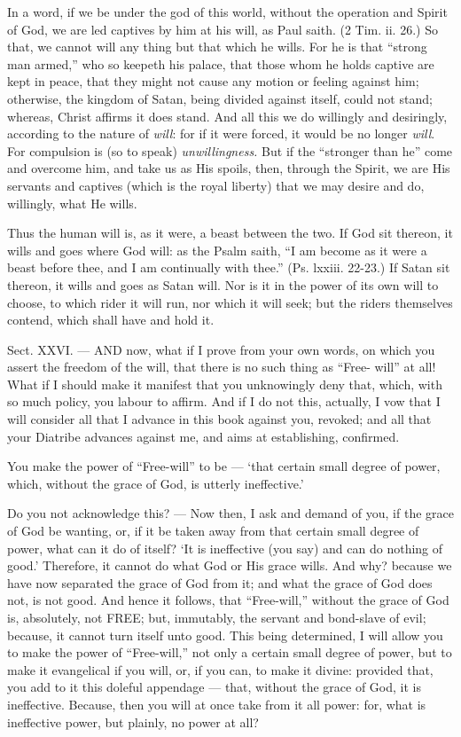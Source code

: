 In a word, if we be under the god of this world, without the operation and Spirit of God, we are led captives by him at his will, as Paul saith. (2 Tim. ii. 26.) So that, we cannot will any thing but that which he wills. For he is that “strong man armed,” who so keepeth his palace, that those whom he holds captive are kept in peace, that they might not cause any motion or feeling against him; otherwise, the kingdom of Satan, being divided against itself, could not stand; whereas, Christ affirms it does stand. And all this we do willingly and desiringly, according to the nature of \emph{will}: for if it were forced, it would be no longer \emph{will}. For compulsion is (so to speak) \emph{unwillingness. }But if the “stronger than he” come and overcome him, and take us as His spoils, then, through the Spirit, we are His servants and captives (which is the royal liberty) that we may desire and do, willingly, what He wills.

Thus the human will is, as it were, a beast between the two. If God sit thereon, it wills and goes where God will: as the Psalm saith, “I am become as it were a beast before thee, and I am continually with thee.” (Ps. lxxiii. 22-23.) If Satan sit thereon, it wills and goes as Satan will. Nor is it in the power of its own will to choose, to which rider it will run, nor which it will seek; but the riders themselves contend, which shall have and hold it.


Sect. XXVI. — AND now, what if I prove from your own words, on which you assert the freedom of the will, that there is no such thing as “Free- will” at all! What if I should make it manifest that you unknowingly deny that, which, with so much policy, you labour to affirm. And if I do not this, actually, I vow that I will consider all that I advance in this book against you, revoked; and all that your Diatribe advances against me, and aims at establishing, confirmed.

You make the power of “Free-will” to be — ‘that certain small degree of power, which, without the grace of God, is utterly ineffective.’

Do you not acknowledge this? — Now then, I ask and demand of you, if the grace of God be wanting, or, if it be taken away from that certain small degree of power, what can it do of itself? ‘It is ineffective (you say) and can do nothing of good.’ Therefore, it cannot do what God or His grace wills. And why? because we have now separated the grace of God from it; and what the grace of God does not, is not good. And hence it follows, that “Free-will,” without the grace of God is, absolutely, not \textsc{FREE}; but, immutably, the servant and bond-slave of evil; because, it cannot turn itself unto good. This being determined, I will allow you to make the power of “Free-will,” not only a certain small degree of power, but to make it evangelical if you will, or, if you can, to make it divine: provided that, you add to it this doleful appendage — that, without the grace of God, it is ineffective. Because, then you will at once take from it all power: for, what is ineffective power, but plainly, no power at all?

